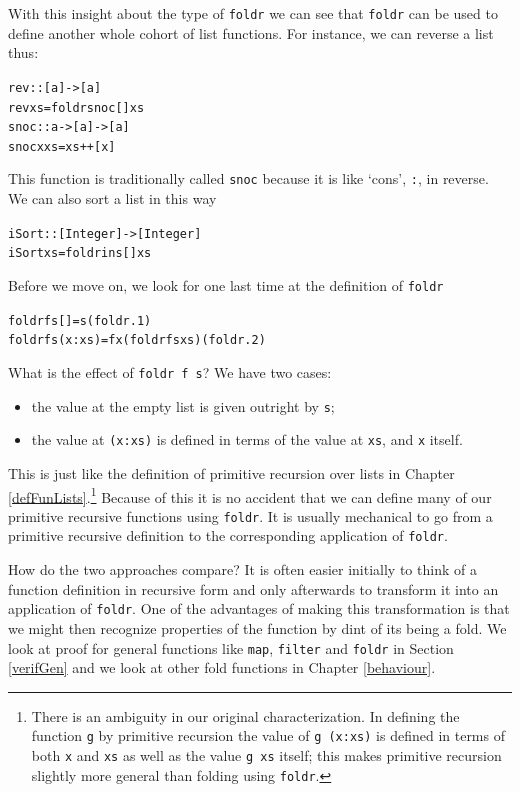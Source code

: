 With this insight about the type of \texttt{foldr} we can see
that \texttt{foldr} can be used to define another whole cohort of list functions.
For instance, we can reverse a list thus:
\begin{alltt}
rev :: [a] -> [a]
rev xs = foldr snoc [] xs
\bl
snoc :: a -> [a] -> [a]
snoc x xs = xs ++ [x]
\end{alltt}
This function is traditionally called \texttt{snoc} because it is like
`cons', \texttt{:},
in reverse.
We can also sort a list in this way
\begin{alltt}
iSort :: [Integer] -> [Integer]
iSort xs = foldr ins [] xs
\end{alltt}
Before we move on, we look for one last time at the definition of
\texttt{foldr}
\begin{alltt}
foldr f s []     = s\hfill(foldr.1)
foldr f s (x:xs) = f x (foldr f s xs)\hfill(foldr.2)
\end{alltt}
What is the effect of \texttt{foldr f s}? We have two cases:
\begin{itemize}
\item the value at the empty list is given outright by \texttt{s};
\item the value at \texttt{(x:xs)} is defined in terms of the value at
\texttt{xs}, and \texttt{x} itself.
\end{itemize}
This is just like the definition of primitive recursion over
lists in Chapter \ref{defFunLists}.\footnote{There is an ambiguity in our original 
characterization. In defining the function \texttt{g} by primitive recursion the value of \texttt{g (x:xs)}
is defined in terms of both \texttt{x} and \texttt{xs} as well as the
value \texttt{g xs} itself; this makes
primitive recursion slightly more general than folding using \texttt{foldr}.}
Because of this it is no accident that we can define many of our
primitive recursive functions using \texttt{foldr}. It is usually mechanical to
go from a primitive recursive definition to the corresponding application of
\texttt{foldr}. 

How do the two approaches compare?
It is often easier initially to think of a function definition in recursive form and
only afterwards to transform it into an application of \texttt{foldr}.
One of the advantages of making this transformation is that we might
then recognize properties of the function by dint of its being a fold.
We look at proof for general functions like \texttt{map}, \texttt{filter} 
and \texttt{foldr} in Section \ref{verifGen} and we look at other fold functions in 
Chapter \ref{behaviour}.

